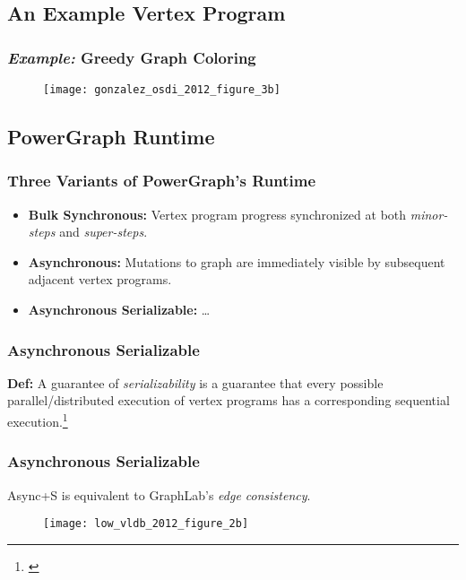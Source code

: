 \subsection{An Example Vertex Program}

\begin{frame}
  \frametitle{\textit{Example:} Greedy Graph Coloring}
  \begin{figure}
    \centering
    \texttt{[image: gonzalez\_osdi\_2012\_figure\_3b]}
    \caption{\cite[OSDI '12]{gonzalez2012powergraph}}
  \end{figure}
\end{frame}


\subsection{PowerGraph Runtime}

\begin{frame}
  \frametitle{Three Variants of PowerGraph's Runtime}
  \begin{itemize}
    \item \textbf{Bulk Synchronous:} Vertex program progress synchronized at
          both \textit{minor-steps} and \textit{super-steps}.
    \item \textbf{Asynchronous:} Mutations to graph are immediately visible by
          subsequent adjacent vertex programs.
    \item \textbf{Asynchronous Serializable:} \ldots
  \end{itemize}
\end{frame}

\begin{frame}
  \frametitle{Asynchronous Serializable}
  \textbf{Def:} A guarantee of \textit{serializability} is a guarantee that
    every possible parallel/distributed execution of vertex programs has a
    corresponding sequential execution.\footnote{\cite[OSDI '12]{gonzalez2012powergraph}}
\end{frame}

\begin{frame}
  \frametitle{Asynchronous Serializable}
  \centering
  Async+S is equivalent to GraphLab's \textit{edge consistency}.\footnotemark
  \begin{figure}
    \texttt{[image: low\_vldb\_2012\_figure\_2b]}
    \caption{\cite[VLDB '12]{low2012distributed}}
  \end{figure}
\end{frame}
